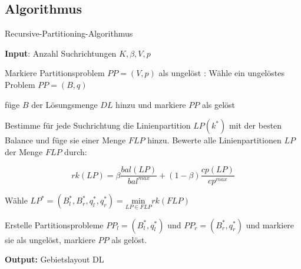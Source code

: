     \subsection{Algorithmus} %
    \label{sub:algorithmus}

      \begin{algorithm}
        \caption{Recursive-Partitioning-Algorithmus}\label{Recursive-Partitioning-Algorithmus}
        \textbf{Input}: Anzahl Suchrichtungen $K, \beta, V, p$
        \begin{algorithmic}[1]
          \State Markiere Partitionsproblem $PP = (V, p)$ als ungelöst
          :
            \State Wähle ein ungelöstes Problem $PP = (B, q)$
            
              \State füge $B$ der Lösungsmenge $DL$ hinzu und markiere $PP$ als gelöst
            \EndIf

              \State Bestimme für jede Suchrichtung die Linienpartition $LP(k^*)$ mit der besten Balance und füge sie einer Menge $FLP$ hinzu.
              \State Bewerte alle Linienpartitionen $LP$ der Menge $FLP$ durch:
              
                \begin{equation*}
                  rk(LP) = \beta\frac{bal(LP)}{bal^{max}} + (1 - \beta)\frac{cp(LP)}{cp^{max}}
                \end{equation*}

              \State Wähle $LP^{*} = (B_{l}^{*}, B_{r}^{*}, q_{l}^{*}, q_{r}^{*}) = \underset{LP \in FLP}{\text{min}}rk(FLP)$ 

              \State Erstelle Partitionsprobleme $PP_l = (B_{l}^{*}, q_{l}^{*})$ und $PP_r = (B_{r}^{*}, q_{r}^{*})$ und markiere sie als ungelöst, markiere $PP$ als gelöst.
            \EndIf
          \EndWhile
        \end{algorithmic}
        \textbf{Output:} Gebietslayout DL
      \end{algorithm}


    
        
       






    


